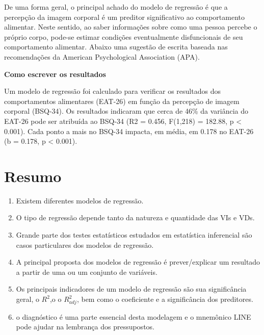 \documentclass[
]{book}
\providecommand{\tightlist}{%
  \setlength{\itemsep}{0pt}\setlength{\parskip}{0pt}}
\newenvironment{explore}{
  \definecolor{shadecolor}{rgb}{0, 0, 0}  %
  \color{white}
  \begin{shaded}}
 {\end{shaded}}
\newenvironment{writing}{
  \definecolor{shadecolor}{rgb}{0, 0, 0}  %
  \color{white}
  \begin{shaded}}
 {\end{shaded}}
\begin{document}
De uma forma geral, o principal achado do modelo de regressão é que a percepção da imagem corporal é um preditor significativo ao comportamento alimentar. Neste sentido, ao saber informações sobre como uma pessoa percebe o próprio corpo, pode-se estimar condições eventualmente disfuncionais de seu comportamento alimentar. Abaixo uma sugestão de escrita baseada nas recomendações da American Psychological Association (APA).

\begin{writing}

\textbf{Como escrever os resultados}

Um modelo de regressão foi calculado para verificar os resultados dos comportamentos alimentares (EAT-26) em função da percepção de imagem corporal (BSQ-34). Os resultados indicaram que cerca de 46\% da variância do EAT-26 pode ser atribuída ao BSQ-34 (R2 = 0.456, F(1,218) = 182.88, p \textless{} 0.001). Cada ponto a mais no BSQ-34 impacta, em média, em 0.178 no EAT-26 (b = 0.178, p \textless{} 0.001).

\end{writing}

\hypertarget{resumo-9}{%
\section{Resumo}\label{resumo-9}}

\begin{explore}

\begin{enumerate}
\def\labelenumi{\arabic{enumi}.}
\tightlist
\item
  Existem diferentes modelos de regressão.\\
\item
  O tipo de regressão depende tanto da natureza e quantidade das VIs e VDs.\\
\item
  Grande parte dos testes estatísticos estudados em estatística inferencial são casos particulares dos modelos de regressão.\\
\item
  A principal proposta dos modelos de regressão é prever/explicar um resultado a partir de uma ou um conjunto de variáveis.\\
\item
  Os principais indicadores de um modelo de regressão são sua significância geral, o \(R^2\),o o \(R^2_{adj}\), bem como o coeficiente e a significância dos preditores.\\
\item
  o diagnóstico é uma parte essencial desta modelagem e o mnemônico LINE pode ajudar na lembrança dos pressupostos.\\
\end{enumerate}

\end{explore}
\end{document}
